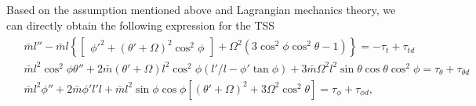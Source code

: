 \documentclass[3p]{elsarticle}
\theoremstyle{plain}
\theoremstyle{remark}
\begin{document}
Based on the assumption mentioned above and Lagrangian mechanics theory, we can directly obtain the following expression for the TSS~\cite{Sun2014304,Mantellato2015}
\begin{align}
\begin{split}
&\bar m l''-\bar m l\left\{\begin{bmatrix}\phi'^2+(\theta'+\Omega)^2\cos^2\phi\end{bmatrix}+\Omega^2(3\cos^2\phi\cos^2\theta-1)\right\}=-\tau_t+\tau_{td}\\
&\bar m l^2\cos^2\phi\theta''+2\bar m (\theta'+\Omega)l^2\cos^2\phi(l'/l-\phi'\tan\phi)+3\bar m \Omega^2l^2\sin\theta\cos\theta\cos^2\phi=\tau_\theta+\tau_{\theta d}\\
&\bar m l^2\phi''+2\bar m \phi'l'l+\bar m l^2\sin\phi\cos\phi\left[(\theta'+\Omega)^2+3 \Omega^2\cos^2\theta\right]=\tau_\phi+\tau_{\phi d},\label{eq:dynamics 1}
\end{split}
\end{align}
\end{document}
